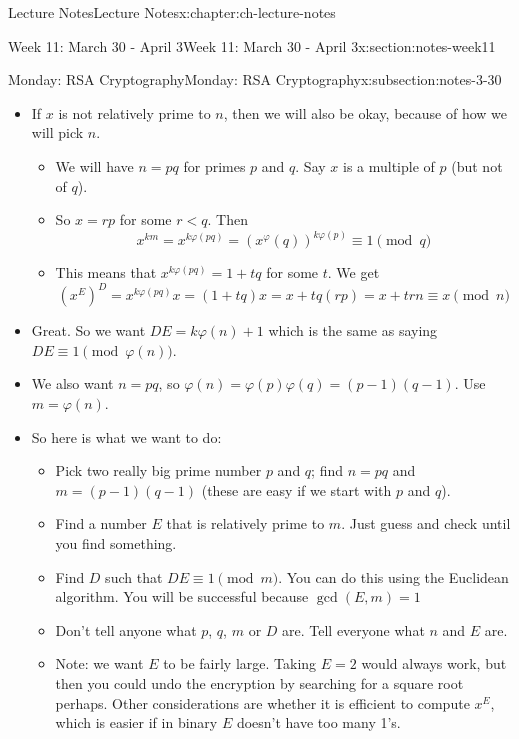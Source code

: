 \documentclass[oneside,11pt,]{book}
\begin{document}
\begin{chapterptx}{Lecture Notes}{}{Lecture Notes}{}{}{x:chapter:ch-lecture-notes}
\begin{sectionptx}{Week 11: March 30 - April 3}{}{Week 11: March 30 - April 3}{}{}{x:section:notes-week11}
\begin{subsectionptx}{Monday: RSA Cryptography}{}{Monday: RSA Cryptography}{}{}{x:subsection:notes-3-30}
\begin{itemize}[label=\textbullet]
\begin{equation*}
(x^E)^D = x^{DE} = x^{k\varphi(n)}x \equiv 1^k x \pmod{n}
\end{equation*}
%
\item{}If \(x\) is not relatively prime to \(n\), then we will also be okay, because of how we will pick \(n\).%
\par
%
\begin{itemize}[label=$\circ$]
\item{}We will have \(n = pq\) for primes \(p\) and \(q\). Say \(x\) is a multiple of \(p\) (but not of \(q\)).%
\item{}So \(x = rp\) for some \(r < q\). Then%
\begin{equation*}
x^{km} = x^{k\varphi(pq)} = (x^\varphi(q))^{k\varphi(p)} \equiv 1 \pmod q
\end{equation*}
%
\item{}This means that \(x^{k\varphi(pq)} = 1 + tq\) for some \(t\). We get%
\begin{equation*}
(x^E)^D = x^{k\varphi(pq)}x = (1+tq)x = x + tq(rp) = x+trn \equiv x \pmod n
\end{equation*}
%
\end{itemize}
%
\item{}Great. So we want \(DE = k\varphi(n) + 1\) which is the same as saying \(DE \equiv 1 \pmod{\varphi(n)}\).%
\item{}We also want \(n = pq\), so \(\varphi(n) = \varphi(p)\varphi(q) = (p-1)(q-1)\). Use \(m = \varphi(n)\).%
\item{}So here is what we want to do:%
\par
%
\begin{itemize}[label=$\circ$]
\item{}Pick two really big prime number \(p\) and \(q\); find \(n = pq\) and \(m = (p-1)(q-1)\) (these are easy if we start with \(p\) and \(q\)).%
\item{}Find a number \(E\) that is relatively prime to \(m\). Just guess and check until you find something.%
\item{}Find \(D\) such that \(DE \equiv 1 \pmod{m}\). You can do this using the Euclidean algorithm. You will be successful because \(\gcd(E, m) = 1\)%
\item{}Don’t tell anyone what \(p\),              \(q\),              \(m\) or \(D\) are. Tell everyone what \(n\) and \(E\) are.%
\item{}Note: we want \(E\) to be fairly large. Taking \(E = 2\) would always work, but then you could undo the encryption by searching for a square root perhaps. Other considerations are whether it is efficient to compute \(x^E\), which is easier if in binary \(E\) doesn’t have too many 1’s.%

\end{itemize}
\end{itemize}
\end{subsectionptx}
\end{sectionptx}
\end{chapterptx}
\end{document}
